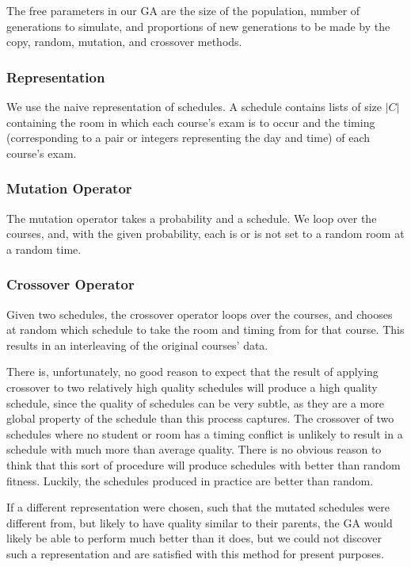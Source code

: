\documentclass[letterpaper]{article}
\begin{document}
      The free parameters in our GA are the size of the population, number of
      generations to simulate, and proportions of new generations to be made by the copy, 
      random, mutation, and crossover methods.
      
    \subsubsection{Representation}
      We use the naive representation of schedules. A schedule contains lists of size $|C|$
      containing the room in which each course's exam is to occur and the timing
      (corresponding to a pair or integers representing the day and time) of each course's
      exam.
      
    \subsubsection{Mutation Operator}
      The mutation operator takes a probability and a schedule. We loop over the courses,
      and, with the given probability, each is or is not set to a random room at a random time.
      
    \subsubsection{Crossover Operator}
      Given two schedules, the crossover operator loops over the courses, and chooses at
      random which schedule to take the room and timing from for that course. This results 
      in an interleaving of the original courses' data.
      
      There is, unfortunately, no good reason to expect that the result of applying 
      crossover to two relatively high quality schedules will produce a high quality 
      schedule, since the quality of schedules can be very subtle, as they are a more 
      global property of the schedule than this process captures. The crossover of two 
      schedules where no student or room has a timing conflict is unlikely to result in 
      a schedule with much more than average quality. There is no obvious reason to think 
      that this sort of procedure will produce schedules with better than random fitness. 
      Luckily, the schedules produced in practice are better than random.
      
      If a different representation were chosen, such that the mutated schedules were
      different from, but likely to have quality similar to their parents, the GA would 
      likely be able to perform much better than it does, but we could not discover such a
      representation and are satisfied with this method for present purposes.
      
\end{document}
